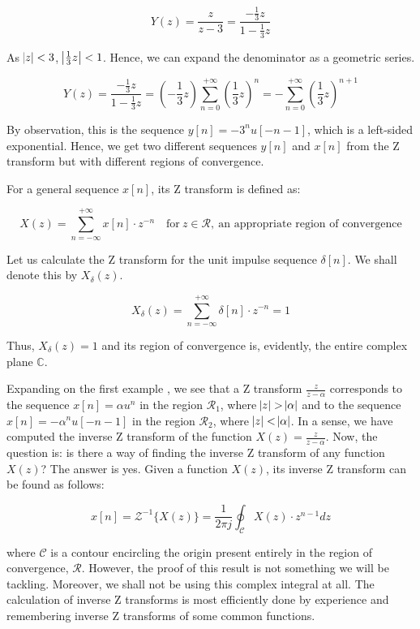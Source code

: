 \documentclass{article}
\theoremstyle{definition}
\begin{document}
\[
	Y(z) = \frac{z}{z-3} = \frac{-\frac{1}{3}z}{1 - \frac{1}{3}z} 
\]	

As $\abs{z} < 3$, $\abs{\frac{1}{3}z} < 1$. Hence, we can expand the denominator as a geometric series.

\[
	Y(z) = \frac{-\frac{1}{3}z}{1 - \frac{1}{3}z}  = \left( -\frac{1}{3}z \right) \sum_{n=0}^{+\infty} \left(\frac{1}{3}z \right)^n = -\sum_{n=0}^{+\infty} \left( \frac{1}{3}z \right)^{n+1}
\]

By observation, this is the sequence $y[n] = -3^n u[-n-1]$, which is a left-sided exponential. Hence, we get two different sequences $y[n]$ and $x[n]$ from the Z transform but with different regions of convergence. 

For a general sequence $x[n]$, its Z transform is defined as:

\[
	\boxed{X(z) = \sum_{n=-\infty}^{+\infty} x[n] \cdot z^{-n}} \quad \text{for} \: z \in \mathcal{R}, \: \text{an appropriate region of convergence}
\]

Let us calculate the Z transform for the unit impulse sequence $\delta[n]$. We shall denote this by $X_\delta(z)$.

\[
	X_\delta(z) = \sum_{n=-\infty}^{+\infty} \delta[n] \cdot z^{-n} = 1
\]

Thus, $X_\delta(z) = 1$ and its region of convergence is, evidently, the entire complex plane $\mathbb{C}$.


Expanding on the first example , we see that a Z transform $\frac{z}{z-\alpha }$ corresponds to the sequence $x[n] = \alpha u^n$ in the region $\mathcal{R}_1$, where $\abs{z} > \abs{\alpha}$ and to the sequence $x[n] = -\alpha^n u[-n-1]$ in the region $\mathcal{R}_2$, where $\abs{z} < \abs{\alpha}$. In a sense, we have computed the inverse Z transform of the function $X(z) = \frac{z}{z-\alpha}$. Now, the question is: is there a way of finding the inverse Z transform of any function $X(z)$? The answer is yes. Given a function $X(z)$, its inverse Z transform can be found as follows:

\[
	x[n] = \mathcal{Z}^{-1} \{X(z)\} = \frac{1}{2\pi j} \oint_{\mathcal{C}} X(z) \cdot z^{n-1} dz  
\]

where $\mathcal{C}$ is a contour encircling the origin present entirely in the region of convergence, $\mathcal{R}$. However, the proof of this result is not something we will be tackling. Moreover, we shall not be using this complex integral at all. The calculation of inverse Z transforms is most efficiently done by experience and remembering inverse Z transforms of some common functions.  \smallskip
 
\end{document}
